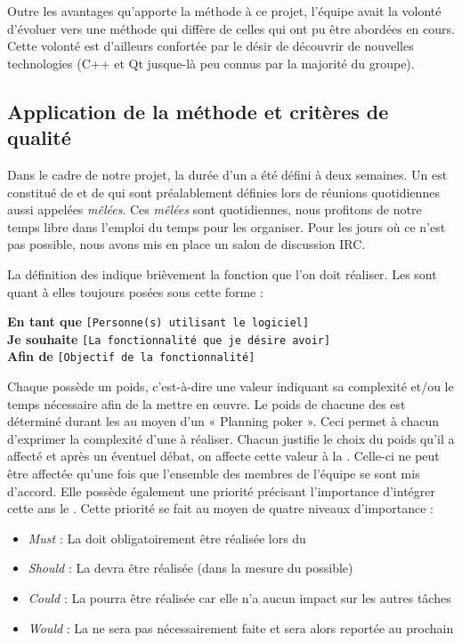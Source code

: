 Outre les avantages qu'apporte la méthode  à ce projet, l'équipe avait la volonté d’évoluer vers une méthode qui diffère de celles qui ont pu
être abordées en cours. Cette volonté est d’ailleurs confortée par le désir de découvrir  de nouvelles technologies (C++ et Qt jusque-là peu connus
par la majorité du groupe). 


\subsection{Application de la méthode  et critères de qualité}
Dans le cadre de notre projet, la durée d'un  a été défini à deux semaines. Un  est constitué de   et de 
  qui sont préalablement définies lors de réunions quotidiennes aussi appelées \textit{mêlées}. Ces \textit{mêlées} sont quotidiennes, nous
profitons de notre temps libre dans l’emploi du temps pour les organiser. Pour les jours où ce n’est pas possible, nous avons mis en place un salon
de discussion IRC.  

La définition des   indique brièvement la fonction que l'on doit réaliser. Les   sont quant à elles toujours posées
sous cette forme :

\begin{exemple}
	\textbf{En tant que} \texttt{[Personne(s) utilisant le logiciel]}\\
	\textbf{Je souhaite} \texttt{[La fonctionnalité que je désire avoir]}\\
	\textbf{Afin de} \texttt{[Objectif de la fonctionnalité]}
\end{exemple}

Chaque  possède un poids, c'est-à-dire une valeur indiquant sa complexité et/ou le temps nécessaire afin de la mettre en œuvre. Le poids de
chacune des  est déterminé durant les  au moyen d’un « Planning poker ». Ceci permet à chacun d’exprimer la complexité d’une
 à réaliser. Chacun justifie le choix du poids qu'il a affecté et après un éventuel débat, on affecte cette valeur à la . Celle-ci ne
peut être affectée qu'une fois que l'ensemble des membres de l'équipe se sont mis d’accord. Elle possède également une priorité précisant
l'importance d’intégrer cette  ans le . Cette priorité se fait au moyen de quatre niveaux d’importance : 

\begin{itemize}
	\item \textit{Must} : La  doit obligatoirement être réalisée lors du 
	\item \textit{Should} : La  devra être réalisée (dans la mesure du possible)
	\item \textit{Could} : La  pourra être réalisée car elle n’a aucun impact sur les autres tâches
	\item \textit{Would} : La  ne sera pas nécessairement faite et sera alors reportée au prochain 
\end{itemize}

